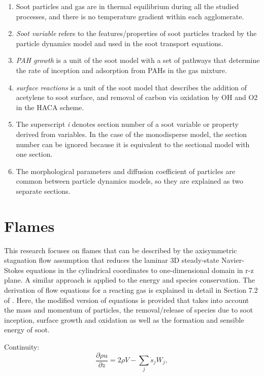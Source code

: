 \begin{enumerate}
\item Soot particles and gas are in thermal equilibrium during all the studied processes, and there is no temperature gradient within each agglomerate.

\item \textit{Soot variable} refers to the features/properties of soot particles tracked by the particle dynamics model and used in the soot transport equations.

\item \textit{PAH growth} is a unit of the soot model with a set of pathways that determine the rate of inception and adsorption from PAHs in the gas mixture.

\item \textit{surface reactions} is a unit of the soot model that describes the addition of acetylene to soot surface, and removal of carbon via oxidation by OH and O2 in the HACA scheme.

\item The superscript \textit{i} denotes section number of a soot variable or property derived from variables. In the case of the monodisperse model, the section number can be ignored because it is equivalent to the sectional model with one section.

\item The morphological parameters and diffusion coefficient of particles are common between particle dynamics models, so they are explained as two separate sections.

\end{enumerate}

\section{Flames}
This research focuses on flames that can be described by the axisymmetric stagnation flow assumption that reduces the laminar 3D steady-state Navier-Stokes equations in the cylindrical coordinates to one-dimensional domain in r-z plane. A similar approach is applied to the energy and species conservation. The derivation of flow equations for a reacting gas is explained in detail in Section 7.2 of \citep{kee2017chemically}. Here, the modified version of equations is provided that takes into account the mass and momentum of particles, the removal/release of species due to soot inception, surface growth and oxidation as well as the formation and sensible energy of soot.

\noindent Continuity:
\begin{equation}
	\frac{\partial \rho u}{\partial z} = 2\rho V - \sum_j \dot{s}_j W_j
	\label{eqn:flame_cont},
\end{equation}

